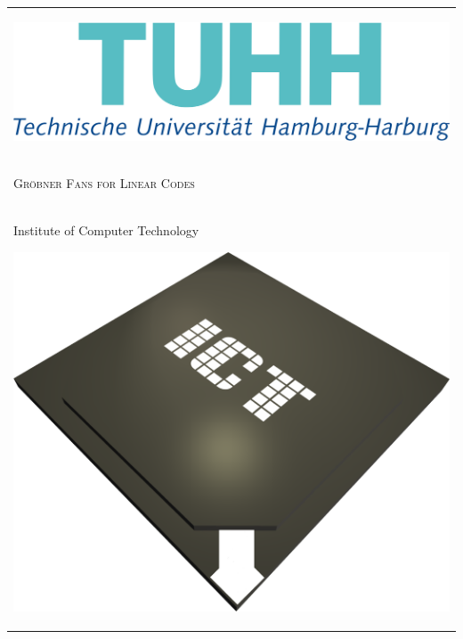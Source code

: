
\begin{center}
\begin{tabular}{p{\textwidth}}


\begin{center}
\includegraphics[scale=0.15]{figures/tuhh.png}
\end{center}


\\

\begin{center}
\LARGE{\textsc{
Gröbner Fans for Linear Codes
}}
\end{center}

\\


\begin{center}
\large{Institute of Computer Technology}
\end{center}


\begin{center}
\includegraphics[scale=0.2]{figures/ictlogo.png}
\end{center}


\end{tabular}
\end{center}
